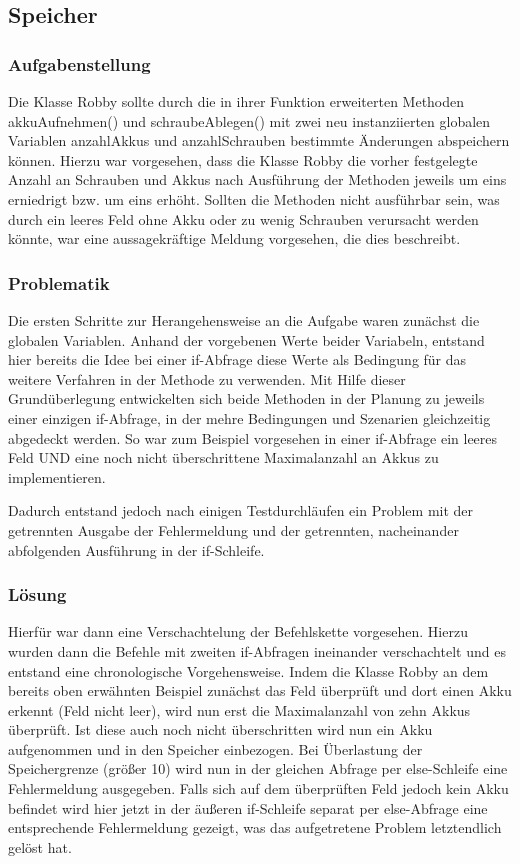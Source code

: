 \subsection{Speicher}

\subsubsection*{Aufgabenstellung}
Die Klasse Robby sollte durch die in ihrer Funktion erweiterten Methoden akkuAufnehmen() und schraubeAblegen() mit zwei neu instanziierten globalen Variablen anzahlAkkus und anzahlSchrauben bestimmte Änderungen abspeichern können.
Hierzu war vorgesehen, dass die Klasse Robby die vorher festgelegte Anzahl an Schrauben und Akkus nach Ausführung der Methoden jeweils um eins erniedrigt bzw. um eins erhöht. Sollten die Methoden nicht ausführbar sein, was durch ein leeres Feld ohne Akku oder zu wenig Schrauben verursacht werden könnte, war eine aussagekräftige Meldung vorgesehen, die dies beschreibt.


\subsubsection*{Problematik}
Die ersten Schritte zur Herangehensweise an die Aufgabe waren zunächst die globalen Variablen. Anhand der vorgebenen Werte beider Variabeln, entstand hier bereits die Idee bei einer if-Abfrage diese Werte als Bedingung für das weitere Verfahren in der Methode zu verwenden.
Mit Hilfe dieser Grundüberlegung entwickelten sich beide Methoden in der Planung zu jeweils einer einzigen if-Abfrage, in der mehre Bedingungen und Szenarien gleichzeitig abgedeckt werden. So war zum Beispiel vorgesehen in einer if-Abfrage ein leeres Feld UND eine noch nicht überschrittene Maximalanzahl an Akkus zu implementieren.

Dadurch entstand jedoch nach einigen Testdurchläufen ein Problem mit der getrennten Ausgabe der Fehlermeldung und der getrennten, nacheinander abfolgenden Ausführung in der if-Schleife.

\subsubsection*{Lösung}
Hierfür war dann eine Verschachtelung der Befehlskette vorgesehen.
Hierzu wurden dann die Befehle mit zweiten if-Abfragen ineinander verschachtelt und es entstand eine chronologische Vorgehensweise.
Indem die Klasse Robby an dem bereits oben erwähnten Beispiel zunächst das Feld überprüft und dort einen Akku erkennt (Feld nicht leer), wird nun erst die Maximalanzahl von zehn Akkus überprüft. Ist diese auch noch nicht überschritten wird nun ein Akku aufgenommen und in den Speicher einbezogen. Bei Überlastung der Speichergrenze (grö\ss{}er 10) wird nun in der gleichen Abfrage per else-Schleife eine Fehlermeldung ausgegeben.
Falls sich auf dem überprüften Feld jedoch kein Akku befindet wird hier jetzt in der äu\ss{}eren if-Schleife separat per else-Abfrage eine entsprechende Fehlermeldung gezeigt, was das aufgetretene Problem letztendlich gelöst hat.

